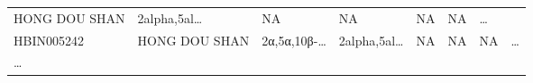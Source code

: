 \documentclass[
]{article}
\begin{document}
\begin{longtable}[]{@{}llllllll@{}}
\begin{minipage}[t]{0.11\columnwidth}
HONG DOU SHAN\strut
\end{minipage} & \begin{minipage}[t]{0.14\columnwidth}\raggedright
2alpha,5al\ldots{}\strut
\end{minipage} & \begin{minipage}[t]{0.14\columnwidth}\raggedright
NA\strut
\end{minipage} & \begin{minipage}[t]{0.08\columnwidth}\raggedright
NA\strut
\end{minipage} & \begin{minipage}[t]{0.09\columnwidth}\raggedright
NA\strut
\end{minipage} & \begin{minipage}[t]{0.11\columnwidth}\raggedright
NA\strut
\end{minipage} & \begin{minipage}[t]{0.03\columnwidth}\raggedright
\ldots{}\strut
\end{minipage}\tabularnewline
\begin{minipage}[t]{0.11\columnwidth}\raggedright
HBIN005242\strut
\end{minipage} & \begin{minipage}[t]{0.11\columnwidth}\raggedright
HONG DOU SHAN\strut
\end{minipage} & \begin{minipage}[t]{0.14\columnwidth}\raggedright
2α,5α,10β-\ldots{}\strut
\end{minipage} & \begin{minipage}[t]{0.14\columnwidth}\raggedright
2alpha,5al\ldots{}\strut
\end{minipage} & \begin{minipage}[t]{0.08\columnwidth}\raggedright
NA\strut
\end{minipage} & \begin{minipage}[t]{0.09\columnwidth}\raggedright
NA\strut
\end{minipage} & \begin{minipage}[t]{0.11\columnwidth}\raggedright
NA\strut
\end{minipage} & \begin{minipage}[t]{0.03\columnwidth}\raggedright
\ldots{}\strut
\end{minipage}\tabularnewline
\begin{minipage}[t]{0.11\columnwidth}\raggedright
\ldots{}\strut
\end{minipage} & \begin{minipage}[t]{0.11\columnwidth}\raggedright

\end{minipage}
\end{longtable}
\end{document}
